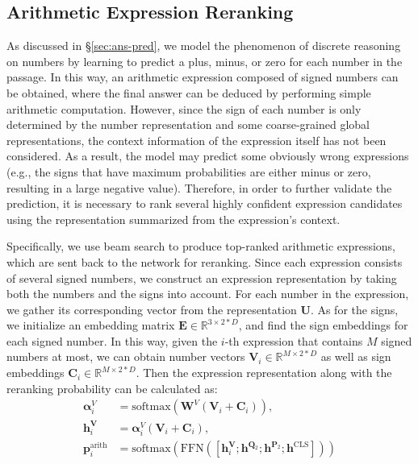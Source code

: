 \documentclass[11pt,a4paper]{article}
\begin{document}
\subsection{Arithmetic Expression Reranking	\label{sec:exp-rerank}}
As discussed in \S\ref{sec:ans-pred}, we model the phenomenon of discrete reasoning on numbers by learning to predict a plus, minus, or zero for each number in the passage.
In this way, an arithmetic expression composed of signed numbers can be obtained, where the final answer can be deduced by performing simple arithmetic computation. 
However, since the sign of each number is only determined by the number representation and some coarse-grained global representations, the context information of the expression itself has not been considered.
As a result, the model may predict some obviously wrong expressions (e.g., the signs that have maximum probabilities are either minus or zero, resulting in a large negative value).
Therefore, in order to further validate the prediction, it is necessary to rank several highly confident expression candidates using the representation summarized from the expression's context.

Specifically, we use beam search to produce top-ranked arithmetic expressions, which are sent back to the network for reranking.
Since each expression consists of several signed numbers, we construct an expression representation by taking both the numbers and the signs into account.
For each number in the expression, we gather its corresponding vector from the representation $\mathbf{U}$.
As for the signs, we initialize an embedding matrix $\mathbf{E} \in\mathbb{R}^{3 \times 2*D}$, and find the sign embeddings for each signed number. 
In this way, given the $i$-th expression that contains $M$ signed numbers at most, we can obtain number vectors $\mathbf{V}_i \in\mathbb{R}^{M \times 2*D}$ as well as sign embeddings $\mathbf{C}_i \in\mathbb{R}^{M \times 2*D}$.
Then the expression representation along with the reranking probability can be calculated as:
\begin{align}
	\boldsymbol{\alpha}^V_i &= \mathrm{softmax}(\mathbf{W}^V (\mathbf{V}_i + \mathbf{C}_i))\nonumber, \\
	\mathbf{h}^{\mathbf{V}}_i &= \boldsymbol{\alpha}^V_i (\mathbf{V}_i + \mathbf{C}_i) \nonumber, \\
	\mathbf{p}^{\mathrm{arith}}_i &= \mathrm{softmax}(\mathrm{FFN}([\mathbf{h}^{\mathbf{V}}_i; \mathbf{h}^{\mathbf{Q}_2}; \mathbf{h}^{\mathbf{P}_2}; \mathbf{h}^{\mathrm{CLS}}])) \nonumber
\end{align}
\end{document}
